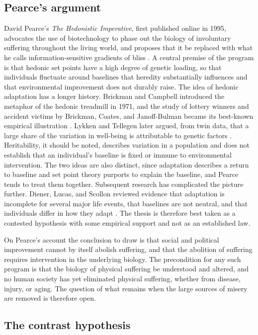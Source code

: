 \documentclass[11pt]{article}
\begin{document}
\subsection{Pearce's argument}

David Pearce's \emph{The Hedonistic Imperative}, first published online in 1995, advocates the use of biotechnology to phase out the biology of involuntary suffering throughout the living world, and proposes that it be replaced with what he calls information-sensitive gradients of bliss \citep{pearce1995}. A central premise of the program is that hedonic set points have a high degree of genetic loading, so that individuals fluctuate around baselines that heredity substantially influences and that environmental improvement does not durably raise. The idea of hedonic adaptation has a longer history. Brickman and Campbell introduced the metaphor of the hedonic treadmill in 1971, and the study of lottery winners and accident victims by Brickman, Coates, and Janoff-Bulman became its best-known empirical illustration \citep{brickman1971,brickman1978}. Lykken and Tellegen later argued, from twin data, that a large share of the variation in well-being is attributable to genetic factors \citep{lykken1996}. Heritability, it should be noted, describes variation in a population and does not establish that an individual's baseline is fixed or immune to environmental intervention. The two ideas are also distinct, since adaptation describes a return to baseline and set point theory purports to explain the baseline, and Pearce tends to treat them together. Subsequent research has complicated the picture further. Diener, Lucas, and Scollon reviewed evidence that adaptation is incomplete for several major life events, that baselines are not neutral, and that individuals differ in how they adapt \citep{diener2006}. The thesis is therefore best taken as a contested hypothesis with some empirical support and not as an established law.

On Pearce's account the conclusion to draw is that social and political improvement cannot by itself abolish suffering, and that the abolition of suffering requires intervention in the underlying biology. The precondition for any such program is that the biology of physical suffering be understood and altered, and no human society has yet eliminated physical suffering, whether from disease, injury, or aging. The question of what remains when the large sources of misery are removed is therefore open.

\subsection{The contrast hypothesis}
\end{document}
